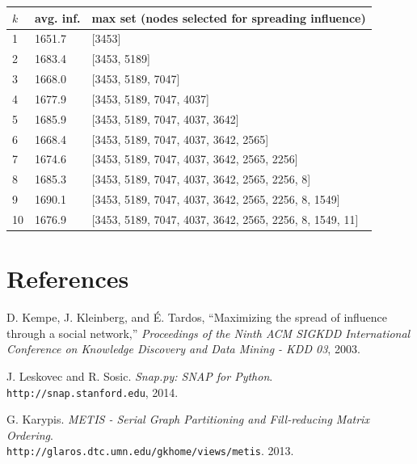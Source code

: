 \documentclass{article}
\begin{document}
      \begin{center}
        \begin{tabular}{|lll|}
          \hline
          $k$ & avg. inf. & max set (nodes selected for spreading influence) \\
          \hline
          1  & 1651.7 & [3453] \\
          2  & 1683.4 & [3453, 5189] \\
          3  & 1668.0 & [3453, 5189, 7047] \\
          4  & 1677.9 & [3453, 5189, 7047, 4037] \\
          5  & 1685.9 & [3453, 5189, 7047, 4037, 3642] \\
          6  & 1668.4 & [3453, 5189, 7047, 4037, 3642, 2565] \\
          7  & 1674.6 & [3453, 5189, 7047, 4037, 3642, 2565, 2256] \\
          8  & 1685.3 & [3453, 5189, 7047, 4037, 3642, 2565, 2256, 8] \\
          9  & 1690.1 & [3453, 5189, 7047, 4037, 3642, 2565, 2256, 8, 1549] \\
          10 & 1676.9 & [3453, 5189, 7047, 4037, 3642, 2565, 2256, 8, 1549, 11] \\
          \hline
        \end{tabular}
      \end{center}
  
  \section{References}
    \begin{thebibliography}{3}
        D. Kempe, J. Kleinberg, and \'E. Tardos, ``Maximizing the spread of influence through a social network,'' \textit{Proceedings of the Ninth ACM SIGKDD International Conference on Knowledge Discovery and Data Mining - KDD 03}, 2003.

        J. Leskovec and R. Sosic. \textit{Snap.py: SNAP for Python}. \\\texttt{http://snap.stanford.edu}, 2014.

      G. Karypis. \textit{METIS - Serial Graph Partitioning and Fill-reducing Matrix Ordering}. \\\texttt{http://glaros.dtc.umn.edu/gkhome/views/metis}. 2013.

    \end{thebibliography}
\end{document}
